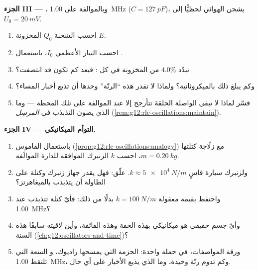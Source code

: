 \begin{problem}
\medskip
\noindent\textbf{الجزء III ---  .}
وبالموالفة على \qty{1.00}{MHz} ($C = \qty{127}{pF}$)، يشحن الهوائي
 لحظيًّا إلى $U_0 = \qty{20}{mV}$.
\begin{enumerate}[resume]
  \item احسب الشحنة $Q_0$  المخزونة $E$.
  \item احسب التيار الأعظمي $I_0$، باستعمال .
  \item تبدّد   $4.0\%$ من  المخزونة
        في كل : فبعد كم  تكون  قد انتصفت؟
  \item وكم يبلغ ذلك بالميكروثانية؟ ولماذا لا تقدر هذه ``الرنّة''
        وحدها أن تذيع أخبار المساء؟
  \item فسّر لماذا لا تبقي  الواصلة الحلقةَ تتأرجح إلا
        عند الموالفة على تلك المحطة --- وما الذي يصون
        التذبذب في \emph{المرسِل}
        (\cref{rem:g12:rlc-oscillations:maintain}).
\end{enumerate}

\medskip
\noindent\textbf{الجزء IV --- التوأم الميكانيكي.}
\begin{enumerate}[resume]
  \item باستعمال القاموس (\cref{prop:g12:rlc-oscillations:analogy})
        مع زلّاجة كتلتها $m = \qty{0.20}{kg}$، احسب
         $k$ الزنبرك الموافقة للدارة الموالَفة.
  \item ولزنبرك سيارة قاسٍ $k \approx \qty{5e4}{N/m}$. علّق:
        فهل يقدر جهاز زنبرك وكتلة على الطاولة أن يتذبذب بالميغاهرتز؟
  \item واحتفظ بقيمة معقولة $k = \qty{100}{N/m}$ بدلًا من ذلك: فأيّ كتلة
        تتذبذب عند \qty{1.00}{MHz}؟
  \item وأيّ جسم حقيقي هو  ميكانيكي بهذه الخفة
        وهذه  الفائقة، وأين لاقيته سابقًا هذه
        السنة (\cref{ch:g12:oscillators-and-time})؟
  \item ورقة المواصفات، في جملة واحدة: الحزمة التي يمسحها راديوك، و
        السعة التي تلتقط \qty{1.00}{MHz}، وكم تدوم رنّة وحيدة،
        وما الذي يذيع الأخبار على أي حال.
\end{enumerate}
\end{problem}

